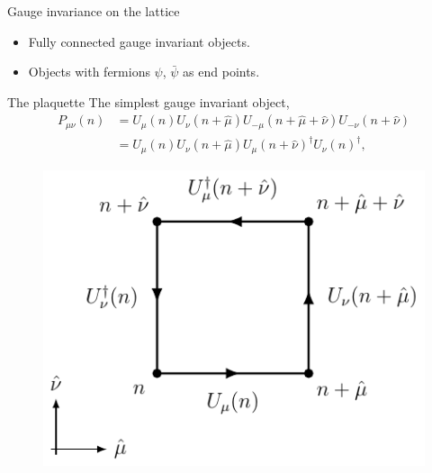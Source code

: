 \documentclass[10pt,show notes on second screen]{beamer}
\begin{document}
\begin{frame}{Gauge invariance on the lattice}
\begin{block}
    \begin{itemize}
        \item<3-> Fully connected gauge invariant objects.
        \item<3-> Objects with fermions $\psi$, $\bar{\psi}$ as end points.
    \end{itemize}
\end{block}
\end{frame}

\begin{frame}{The plaquette}
The simplest gauge invariant object,
\begin{align*}
    P_{\mu\nu}(n) &= U_\mu(n) U_{\nu}(n+\hat{\mu}) U_{-\mu}(n+\hat{\mu}+\hat{\nu}) U_{-\nu} (n+\hat{\nu}) \nonumber \\
    &= U_\mu(n) U_{\nu}(n+\hat{\mu}) U_{\mu}(n+\hat{\nu})^\dagger U_{\nu} (n)^\dagger,
\end{align*}
\begin{figure}[h!tb]
    \centering
    \includegraphics[scale=1]{../figures/illustrations/lqcd/plaquette/plaquette}
\end{figure}
\end{frame}
\end{document}
